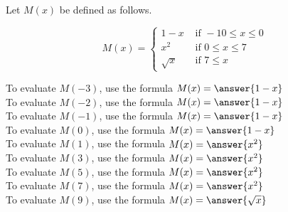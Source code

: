 \documentclass{ximera}
\author{Lee Wayand}
\begin{document}
\begin{exercise}




Let $M(x)$ be defined as follows.

\[
M(x) = 
\begin{cases}
  1 - x & \text{ if } -10 \le x \leq 0 \\
  x^2 & \text{ if } 0 \le x \leq 7 \\
  \sqrt{x} & \text{ if } 7 \le x 
\end{cases}
\]



To evaluate $M(-3)$, use the formula $M(x) = \answer{1 - x}$ \\


To evaluate $M(-2)$, use the formula $M(x) = \answer{1 - x}$ \\


To evaluate $M(-1)$, use the formula $M(x) = \answer{1 - x}$ \\


To evaluate $M(0)$, use the formula $M(x) = \answer{1 - x}$ \\


To evaluate $M(1)$, use the formula $M(x) = \answer{x^2}$ \\


To evaluate $M(3)$, use the formula $M(x) = \answer{x^2}$ \\


To evaluate $M(5)$, use the formula $M(x) = \answer{x^2}$ \\


To evaluate $M(7)$, use the formula $M(x) = \answer{x^2}$ \\


To evaluate $M(9)$, use the formula $M(x) = \answer{\sqrt{x}}$ \\


\end{exercise}
\end{document}
